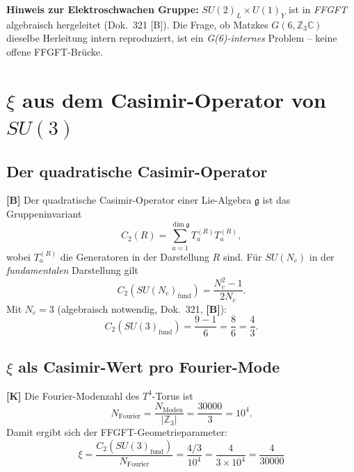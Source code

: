 \textbf{Hinweis zur Elektroschwachen Gruppe:}
$SU(2)_L\times U(1)_Y$ ist in \emph{FFGFT} algebraisch hergeleitet
(Dok.~321 [B]). Die Frage, ob Matzkes $G(6,\mathbb{Z}_3\mathbb{C})$
dieselbe Herleitung intern reproduziert, ist ein \emph{G(6)-internes} Problem
-- keine offene FFGFT-Brücke.


\section{$\xi$ aus dem Casimir-Operator von $SU(3)$}

\subsection{Der quadratische Casimir-Operator}

\textbf{[B]} Der quadratische Casimir-Operator einer Lie-Algebra $\mathfrak{g}$
ist das Gruppeninvariant
\begin{equation}
  C_2(R) = \sum_{a=1}^{\dim\mathfrak{g}} T_a^{(R)} T_a^{(R)},
  \label{eq:casimir_def}
\end{equation}
wobei $T_a^{(R)}$ die Generatoren in der Darstellung $R$ sind.
Für $SU(N_c)$ in der \emph{fundamentalen} Darstellung gilt
\begin{equation}
  C_2(SU(N_c)_{\text{fund}}) = \frac{N_c^2 - 1}{2N_c}.
  \label{eq:casimir_SUN}
\end{equation}
Mit $N_c = 3$ (algebraisch notwendig, Dok.~321, \textbf{[B]}):
\begin{equation}
  C_2(SU(3)_{\text{fund}})
  = \frac{9 - 1}{6} = \frac{8}{6} = \frac{4}{3}.
  \label{eq:casimir_SU3}
\end{equation}

\subsection{$\xi$ als Casimir-Wert pro Fourier-Mode}

\textbf{[K]} Die Fourier-Modenzahl des $T^4$-Torus ist
\begin{equation}
  N_{\text{Fourier}} = \frac{N_{\text{Moden}}}{|\mathbb{Z}_3|}
  = \frac{30000}{3} = 10^4.
  \label{eq:NFourier}
\end{equation}
Damit ergibt sich der FFGFT-Geometrieparameter:
\begin{equation}
  \boxed{\xi = \frac{C_2(SU(3)_{\text{fund}})}{N_{\text{Fourier}}}
  = \frac{4/3}{10^4}
  = \frac{4}{3 \times 10^4}
  = \frac{4}{30000}}
  \label{eq:xi_casimir}
\end{equation}

